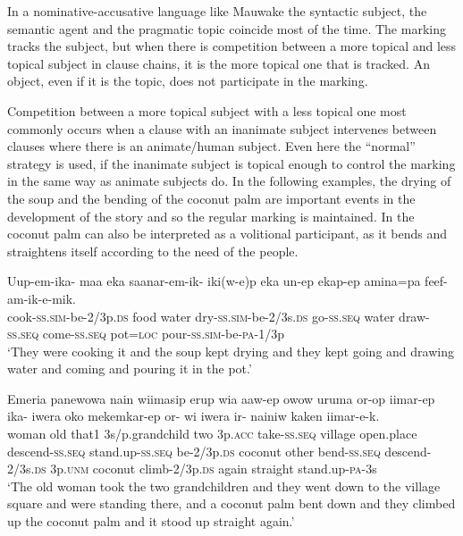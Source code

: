 In a nominative-accusative language like Mauwake the syntactic subject, the semantic agent and the pragmatic topic coincide most of the time. The  marking tracks the subject, but when there is competition between a more topical and less topical subject in clause chains, it is the more topical one that is tracked. An object, even if it is the topic, does not participate in the  marking.

Competition between a more topical subject with a less topical one most commonly occurs when a clause with an inanimate subject intervenes between clauses where there is an animate/human subject. Even here the ``normal''  strategy is used, if the inanimate subject is topical enough to control the  marking in the same way as animate subjects do. In the following examples, the drying of the soup  and the bending of the coconut palm  are important events in the development of the story and so the regular  marking is maintained. In  the coconut palm can also be interpreted as a volitional participant, as it bends and straightens itself according to the need of the people.

\ea%
\label{ex:8:x1474}
\gll Uup-em-ika- \textstyleEmphasizedVernacularWords{} maa  eka  saanar-em-ik- iki(w-e)p  eka  un-ep  ekap-ep  amina=pa feef-am-ik-e-mik.\\
cook-\textsc{ss}.\textsc{sim}-be-2/3p.\textsc{ds} food water  dry-\textsc{ss}.\textsc{sim}-be-2/3s.\textsc{ds} go-\textsc{ss}.\textsc{seq}  water  draw-\textsc{ss}.\textsc{seq} come-\textsc{ss}.\textsc{seq} pot=\textsc{loc} pour-\textsc{ss}.\textsc{sim}-be-\textsc{pa}-1/3p\\
\glt`They were cooking it and the soup kept drying and they kept going and drawing water and coming and pouring it in the pot.'
\z


\ea%
\label{ex:8:x1480}
\gll Emeria  panewowa  nain  wiimasip  erup  wia  aaw-ep owow  uruma  or-op  iimar-ep  ika- iwera  oko  mekemkar-ep  or-  wi  iwera ir-  nainiw  kaken  iimar-e-k.\\
woman  old  that1  3s/p.grandchild  two  3p.\textsc{acc} take-\textsc{ss}.\textsc{seq} village open.place descend-\textsc{ss}.\textsc{seq} stand.up-\textsc{ss}.\textsc{seq} be-2/3p.\textsc{ds} coconut  other  bend-\textsc{ss}.\textsc{seq} descend-2/3s.\textsc{ds} 3p.\textsc{unm} coconut climb-2/3p.\textsc{ds} again  straight  stand.up-\textsc{pa}-3s\\
\glt`The old woman took the two grandchildren and they went down to the village square and were standing there, and a coconut palm bent down and they climbed up the coconut palm and it stood up straight again.'
\z


